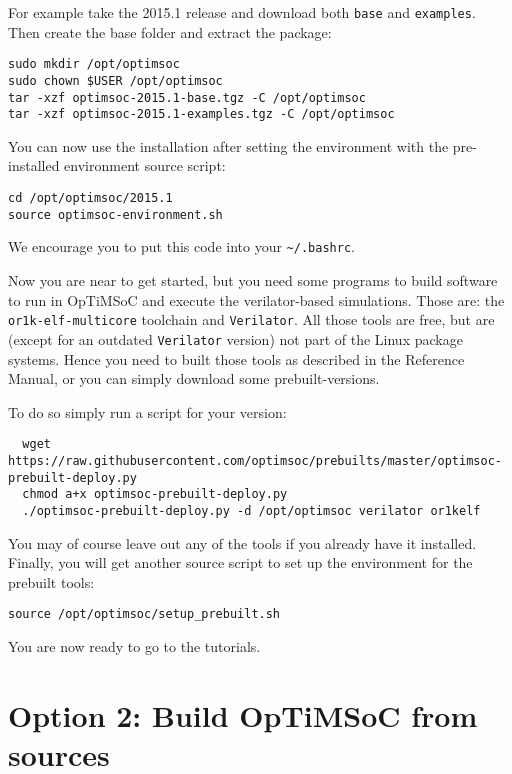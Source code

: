 For example take the 2015.1 release and download both \verb|base| and
\verb|examples|. Then create the base folder and extract the package:

\begin{lstlisting}
sudo mkdir /opt/optimsoc
sudo chown $USER /opt/optimsoc
tar -xzf optimsoc-2015.1-base.tgz -C /opt/optimsoc
tar -xzf optimsoc-2015.1-examples.tgz -C /opt/optimsoc
\end{lstlisting}

You can now use the installation after setting the environment with
the pre-installed environment source script:

\begin{lstlisting}
cd /opt/optimsoc/2015.1
source optimsoc-environment.sh
\end{lstlisting}

We encourage you to put this code into your \verb|~/.bashrc|.

Now you are near to get started, but you need some programs to build
software to run in OpTiMSoC and execute the verilator-based
simulations. Those are: the \verb|or1k-elf-multicore| toolchain and
\verb|Verilator|. All those tools are free, but are (except for an
outdated \verb|Verilator| version) not part of the Linux package
systems. Hence you need to built those tools as described in the
Reference Manual, or you can simply download some prebuilt-versions.

To do so simply run a script for your version:

\begin{lstlisting}
  wget https://raw.githubusercontent.com/optimsoc/prebuilts/master/optimsoc-prebuilt-deploy.py
  chmod a+x optimsoc-prebuilt-deploy.py
  ./optimsoc-prebuilt-deploy.py -d /opt/optimsoc verilator or1kelf
\end{lstlisting}

You may of course leave out any of the tools if you already have it
installed. Finally, you will get another source script to set up the
environment for the prebuilt tools:

\begin{lstlisting}
source /opt/optimsoc/setup_prebuilt.sh
\end{lstlisting}

You are now ready to go to the tutorials.

\section{Option 2: Build OpTiMSoC from sources}

